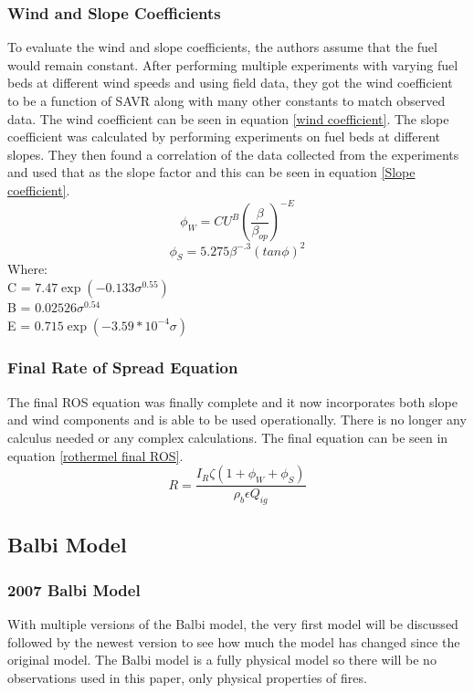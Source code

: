\documentclass{article}
\begin{document}
\subsubsection{Wind and Slope Coefficients}
\indent To evaluate the wind and slope coefficients, the authors assume that the fuel would remain constant. After performing multiple experiments with varying fuel beds at different wind speeds and using field data, they got the wind coefficient to be a function of SAVR along with many other constants to match observed data. The wind coefficient can be seen in equation \ref{wind coefficient}. The slope coefficient was calculated by performing experiments on fuel beds at different slopes. They then found a correlation of the data collected from the experiments and used that as the slope factor and this can be seen in equation \ref{Slope coefficient}.
\begin{equation}
	\label{wind coefficient}
	\phi _ W = C U^{B} (\frac {\beta} {\beta_{op}}) ^ {-E}
\end{equation}
\begin{equation}
	\label{Slope coefficient}
	\phi _ S = 5.275 \beta ^ {-.3} (tan \phi)^{2}
\end{equation}
Where: \\
C = $7.47 \exp(-0.133 \sigma^{0.55})$ \\
B = $0.02526 \sigma^{0.54}$\\
E = $0.715 \exp(-3.59 * 10^{-4} \sigma)$\\
\subsubsection{Final Rate of Spread Equation}
\indent The final ROS equation was finally complete and it now incorporates both slope and wind components and is able to be used operationally. There is no longer any calculus needed or any complex calculations. The final equation can be seen in equation \ref{rothermel final ROS}. 
\begin{equation}
	\label{rothermel final ROS} 
	R = \frac {I_R \zeta (1 + \phi _ W + \phi _ S )} {\rho _ b \epsilon Q_{ig}}
\end{equation}
\subsection{Balbi Model}
\subsubsection*{2007 Balbi Model}
\indent With multiple versions of the Balbi model, the very first model will be discussed followed by the newest version to see how much the model has changed since the original model. The Balbi model is a fully physical model so there will be no observations used in this paper, only physical properties of fires.
\end{document}
